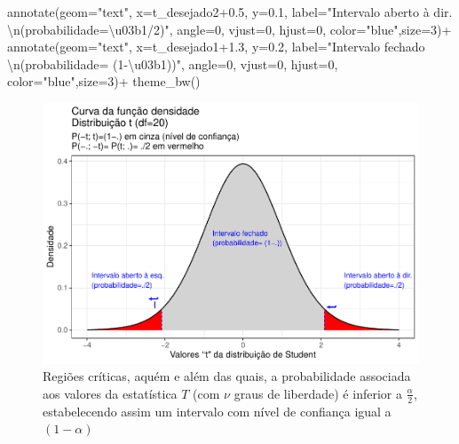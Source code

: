 \documentclass[
]{book}
\newenvironment{Shaded}{\begin{snugshade}}{\end{snugshade}}
\newcommand{\AttributeTok}[1]{\textcolor[rgb]{0.77,0.63,0.00}{#1}}
\newcommand{\DecValTok}[1]{\textcolor[rgb]{0.00,0.00,0.81}{#1}}
\newcommand{\FloatTok}[1]{\textcolor[rgb]{0.00,0.00,0.81}{#1}}
\newcommand{\FunctionTok}[1]{\textcolor[rgb]{0.00,0.00,0.00}{#1}}
\newcommand{\NormalTok}[1]{#1}
\newcommand{\SpecialCharTok}[1]{\textcolor[rgb]{0.00,0.00,0.00}{#1}}
\newcommand{\StringTok}[1]{\textcolor[rgb]{0.31,0.60,0.02}{#1}}
\begin{document}
\begin{Shaded}
\begin{Highlighting}[]
  \FunctionTok{annotate}\NormalTok{(}\AttributeTok{geom=}\StringTok{"text"}\NormalTok{, }\AttributeTok{x=}\NormalTok{t\_desejado2}\FloatTok{+0.5}\NormalTok{, }\AttributeTok{y=}\FloatTok{0.1}\NormalTok{, }\AttributeTok{label=}\StringTok{"Intervalo aberto à dir. }\SpecialCharTok{\textbackslash{}n}\StringTok{(probabilidade=\textbackslash{}u03b1/2)"}\NormalTok{, }\AttributeTok{angle=}\DecValTok{0}\NormalTok{, }\AttributeTok{vjust=}\DecValTok{0}\NormalTok{, }\AttributeTok{hjust=}\DecValTok{0}\NormalTok{, }\AttributeTok{color=}\StringTok{"blue"}\NormalTok{,}\AttributeTok{size=}\DecValTok{3}\NormalTok{)}\SpecialCharTok{+}
  \FunctionTok{annotate}\NormalTok{(}\AttributeTok{geom=}\StringTok{"text"}\NormalTok{, }\AttributeTok{x=}\NormalTok{t\_desejado1}\FloatTok{+1.3}\NormalTok{, }\AttributeTok{y=}\FloatTok{0.2}\NormalTok{, }\AttributeTok{label=}\StringTok{"Intervalo fechado }\SpecialCharTok{\textbackslash{}n}\StringTok{(probabilidade= (1{-}\textbackslash{}u03b1))"}\NormalTok{, }\AttributeTok{angle=}\DecValTok{0}\NormalTok{, }\AttributeTok{vjust=}\DecValTok{0}\NormalTok{, }\AttributeTok{hjust=}\DecValTok{0}\NormalTok{, }\AttributeTok{color=}\StringTok{"blue"}\NormalTok{,}\AttributeTok{size=}\DecValTok{3}\NormalTok{)}\SpecialCharTok{+}  \FunctionTok{theme\_bw}\NormalTok{()}
\end{Highlighting}
\end{Shaded}

\begin{figure}

{\centering \includegraphics[width=1\linewidth]{apostila_files/figure-latex/fig63-1} 

}

\caption{Regiões críticas, aquém e além das quais, a probabilidade associada aos valores da estatística $T$ (com $\nu$ graus de liberdade) é inferior a $\frac{\alpha}{2}$, estabelecendo assim um intervalo com nível de confiança igual a $(1-\alpha)$}\label{fig:fig63}
\end{figure}
\end{document}
